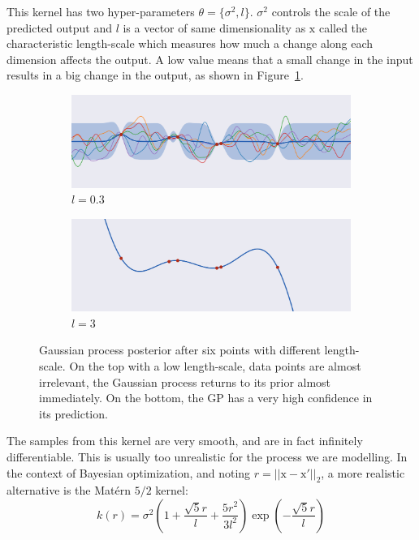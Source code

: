 This kernel has two hyper-parameters $\theta = \{ \sigma^2 , l \}$. $\sigma^2$ controls the scale of the predicted output and $l$ is a vector of same dimensionality as $\mathrm{x}$ called the characteristic length-scale which measures how much a change along each dimension affects the output. A low value means that a small change in the input results in a big change in the output, as shown in Figure~\ref{fig:gp_lengthscale}.

\begin{figure}[htb]
    \centering
    \begin{subfigure}[b]{\textwidth}
        \includegraphics[width=\textwidth]{img_hyperopt/gp_lengthscale_small}
        \caption{$l = 0.3$}
    \end{subfigure}

    \begin{subfigure}[b]{\textwidth}
        \includegraphics[width=\textwidth]{img_hyperopt/gp_lengthscale_big}
        \caption{$l = 3$}
    \end{subfigure}
    \caption{Gaussian process posterior after six points with different length-scale. On the top with a low length-scale, data points are almost irrelevant, the Gaussian process returns to its prior almost immediately. On the bottom, the GP has a very high confidence in its prediction.}
    \label{fig:gp_lengthscale}
\end{figure}

The samples from this kernel are very smooth, and are in fact infinitely differentiable. This is usually too unrealistic for the process we are modelling. In the context of Bayesian optimization, and noting $r = || \mathrm{x} - \mathrm{x'} ||_2$, a more realistic alternative is the Matérn $5/2$ kernel:
\begin{equation}
    k(r) = \sigma^2 \left( 1 + \frac{\sqrt{5}r}{l} + \frac{5r^2}{3l^2} \right) \exp \left( - \frac{\sqrt{5}r}{l}\right)
\end{equation}

